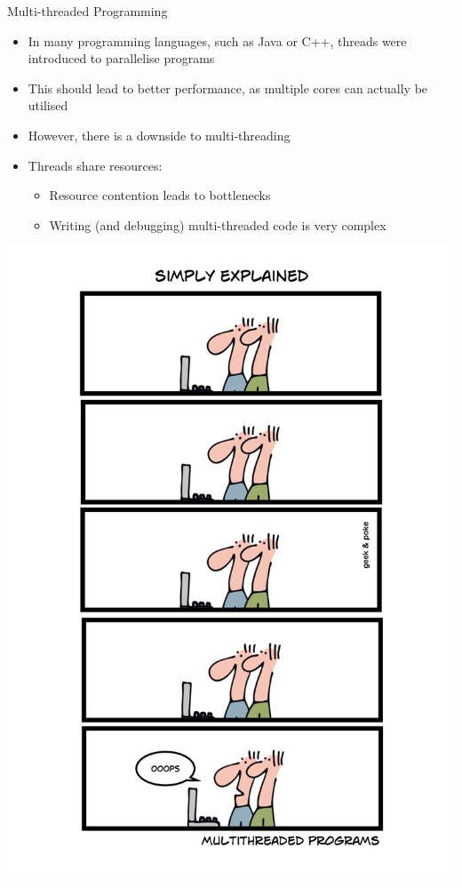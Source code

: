 \documentclass[12pt,xcolor=svgnames]{beamer}
\begin{document}
\begin{frame}{Multi-threaded Programming}
\begin{itemize}
\item In many programming languages, such as Java or C++, threads were introduced to \alert{parallelise} programs
\item This should lead to better performance, as multiple cores can actually be utilised
\item However, there is a downside to multi-threading
\item Threads share resources:
\begin{itemize}
\item Resource contention leads to bottlenecks
\item Writing (and debugging) multi-threaded code is very complex
\end{itemize}
\end{itemize}

\framebreak

\begin{center}
\includegraphics[height=0.85\textheight]{images/multithreaded.png}
\end{center}
\end{frame}
\end{document}
